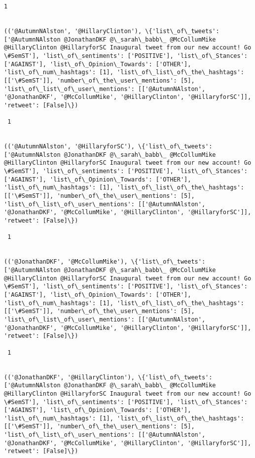 \documentclass[11pt]{article}
\begin{document}
\begin{Verbatim}[commandchars=\\\{\}]
 1
 

(('@AutumnNAlston', '@HillaryClinton'), \{'list\_of\_tweets': ['@AutumnNAlston @JonathanDKF @\_sarah\_babb\_ @McCollumMike @HillaryClinton @HillaryforSC Inaugural tweet from our new account! Go \#SemST'], 'list\_of\_sentiments': ['POSITIVE'], 'list\_of\_Stances': ['AGAINST'], 'list\_of\_Opinion\_Towards': ['OTHER'], 'list\_of\_num\_hashtags': [1], 'list\_of\_list\_of\_the\_hashtags': [['\#SemST']], 'number\_of\_the\_user\_mentions': [5], 'list\_of\_list\_of\_user\_mentions': [['@AutumnNAlston', '@JonathanDKF', '@McCollumMike', '@HillaryClinton', '@HillaryforSC']], 'retweet': [False]\})

 1
 

(('@AutumnNAlston', '@HillaryforSC'), \{'list\_of\_tweets': ['@AutumnNAlston @JonathanDKF @\_sarah\_babb\_ @McCollumMike @HillaryClinton @HillaryforSC Inaugural tweet from our new account! Go \#SemST'], 'list\_of\_sentiments': ['POSITIVE'], 'list\_of\_Stances': ['AGAINST'], 'list\_of\_Opinion\_Towards': ['OTHER'], 'list\_of\_num\_hashtags': [1], 'list\_of\_list\_of\_the\_hashtags': [['\#SemST']], 'number\_of\_the\_user\_mentions': [5], 'list\_of\_list\_of\_user\_mentions': [['@AutumnNAlston', '@JonathanDKF', '@McCollumMike', '@HillaryClinton', '@HillaryforSC']], 'retweet': [False]\})

 1
 

(('@JonathanDKF', '@McCollumMike'), \{'list\_of\_tweets': ['@AutumnNAlston @JonathanDKF @\_sarah\_babb\_ @McCollumMike @HillaryClinton @HillaryforSC Inaugural tweet from our new account! Go \#SemST'], 'list\_of\_sentiments': ['POSITIVE'], 'list\_of\_Stances': ['AGAINST'], 'list\_of\_Opinion\_Towards': ['OTHER'], 'list\_of\_num\_hashtags': [1], 'list\_of\_list\_of\_the\_hashtags': [['\#SemST']], 'number\_of\_the\_user\_mentions': [5], 'list\_of\_list\_of\_user\_mentions': [['@AutumnNAlston', '@JonathanDKF', '@McCollumMike', '@HillaryClinton', '@HillaryforSC']], 'retweet': [False]\})

 1
 

(('@JonathanDKF', '@HillaryClinton'), \{'list\_of\_tweets': ['@AutumnNAlston @JonathanDKF @\_sarah\_babb\_ @McCollumMike @HillaryClinton @HillaryforSC Inaugural tweet from our new account! Go \#SemST'], 'list\_of\_sentiments': ['POSITIVE'], 'list\_of\_Stances': ['AGAINST'], 'list\_of\_Opinion\_Towards': ['OTHER'], 'list\_of\_num\_hashtags': [1], 'list\_of\_list\_of\_the\_hashtags': [['\#SemST']], 'number\_of\_the\_user\_mentions': [5], 'list\_of\_list\_of\_user\_mentions': [['@AutumnNAlston', '@JonathanDKF', '@McCollumMike', '@HillaryClinton', '@HillaryforSC']], 'retweet': [False]\})


\end{Verbatim}
\end{document}
